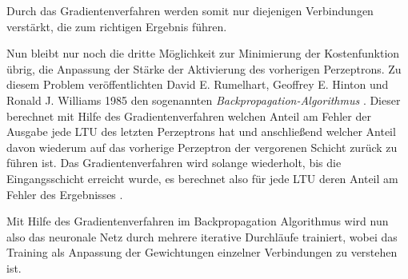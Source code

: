Durch das Gradientenverfahren werden somit nur diejenigen Verbindungen verstärkt, die zum richtigen Ergebnis führen. 

Nun bleibt nur noch die dritte Möglichkeit zur Minimierung der Kostenfunktion übrig, die Anpassung der Stärke der Aktivierung des vorherigen Perzeptrons. Zu diesem Problem veröffentlichten David E. Rumelhart, Geoffrey E. Hinton und Ronald J. Williams 1985 den sogenannten \textit{Backpropagation-Algorithmus} \cite{DavidE.Rumelhart.September1985}. Dieser berechnet mit Hilfe des Gradientenverfahren welchen Anteil am Fehler der Ausgabe jede LTU des letzten Perzeptrons hat und anschließend welcher Anteil davon wiederum auf das vorherige Perzeptron der vergorenen Schicht zurück zu führen ist. Das Gradientenverfahren wird solange wiederholt, bis die Eingangsschicht erreicht wurde, es berechnet also für jede LTU deren Anteil am Fehler des Ergebnisses \cite{AurelienGeron.2018}.

Mit Hilfe des Gradientenverfahren im Backpropagation Algorithmus wird nun also das neuronale Netz durch mehrere iterative Durchläufe trainiert, wobei das Training als Anpassung der Gewichtungen einzelner Verbindungen zu verstehen ist.